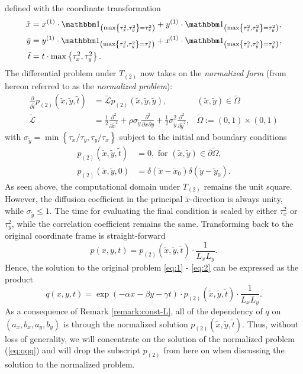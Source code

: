 defined with the coordinate transformation
\begin{align}
  \tilde{x} &= x^{(1)}\cdot \Indicator{ \max\left\{\tau_x^2, \tau_y^2 \right\} = \tau_x^2} + y^{(1)}\cdot \Indicator{ \max\left\{\tau_x^2, \tau_y^2 \right\} = \tau_y^2}, \\
  \tilde{y} &= y^{(1)}\cdot \Indicator{ \max\left\{\tau_x^2, \tau_y^2 \right\} = \tau_x^2} + x^{(1)}\cdot \Indicator{ \max\left\{\tau_x^2, \tau_y^2 \right\} = \tau_y^2}, \\
  \tilde{t} &= t\cdot \max\left\{\tau_x^2, \tau_y^2 \right\}.
\end{align}
The differential problem under $T_{(2)}$ now takes on the
\textit{normalized form} (from hereon referred to as the
\textit{normalized problem}):
\begin{align}
  \frac{\partial}{\partial \tilde{t}} p_{(2)}(\tilde{x},\tilde{y},\tilde{t}) &= \tilde{\mathcal{L}} p_{(2)}(\tilde{x},\tilde{y},\tilde{y}), & (\tilde{x}, \tilde{y}) \in \tilde{\Omega} \label{eq:qqq} \\
  \tilde{\mathcal{L}} &= \frac{1}{2} \frac{\partial^2}{\partial \tilde{x}^2} + \rho \sigma_{\tilde{y}} \frac{\partial^2}{\partial \tilde{x} \partial \tilde{y}} + \frac{1}{2} \sigma^2_{\tilde{y}} \frac{\partial^2}{\partial \tilde{y}^2},& \tilde{\Omega} := (0,1) \times (0,1)
\end{align}
with
$\sigma_{\tilde{y}} = \min\left\{ \tau_x/\tau_y, \tau_y/\tau_x
\right\}$ subject to the initial and boundary conditions
\begin{align}
  p_{(2)}(\tilde{x},\tilde{y},\tilde{t}) &=0,  \mbox{ for }  (\tilde{x},\tilde{y}) \in \partial\tilde{\Omega}, \nonumber \\
  p_{(2)}(\tilde{x},\tilde{y},0) &= \delta\left( \tilde{x} - \tilde{x}_0 \right)\delta\left( \tilde{y} - \tilde{y}_0 \right). \label{eq:qqq-2}
\end{align}
As seen above, the computational domain under $T_{(2)}$ remains the
unit square. However, the diffusion coefficient in the principal
$\tilde{x}$-direction is always unity, while
$\sigma_{\tilde{y}} \leq 1$. The time for evaluating the final
condition is scaled by either $\tau_x^2$ or $\tau_y^2$, while the
correlation coefficient remains the same. Transforming back to the
original coordinate frame is straight-forward
\[
  p(x,y,t) = p_{(2)}(\tilde{x}, \tilde{y}, \tilde{t}) \cdot \frac{1}{L_xL_y}.
\]
Hence, the solution to the original problem \eqref{eq:1} -
\eqref{eq:2} can be expressed as the product
\[
  q(x,y,t) = \exp(-\alpha x - \beta y - \gamma t) \cdot
  p_{(2)}(\tilde{x}, \tilde{y}, \tilde{t}) \cdot \frac{1}{L_xL_y}.
\]
As a consequence of Remark \ref{remark:const-L}, all of the dependency
of $q$ on $(a_x,b_x,a_y,b_y)$ is through the normalized solution
$p_{(2)}(\tilde{x},\tilde{y},\tilde{t})$. Thus, without loss of
generality, we will concentrate on the solution of the normalized
problem (\ref{eq:qqq}) and will drop the subscript $p_{(2)}$ from here
on when discussing the solution to the normalized problem.



